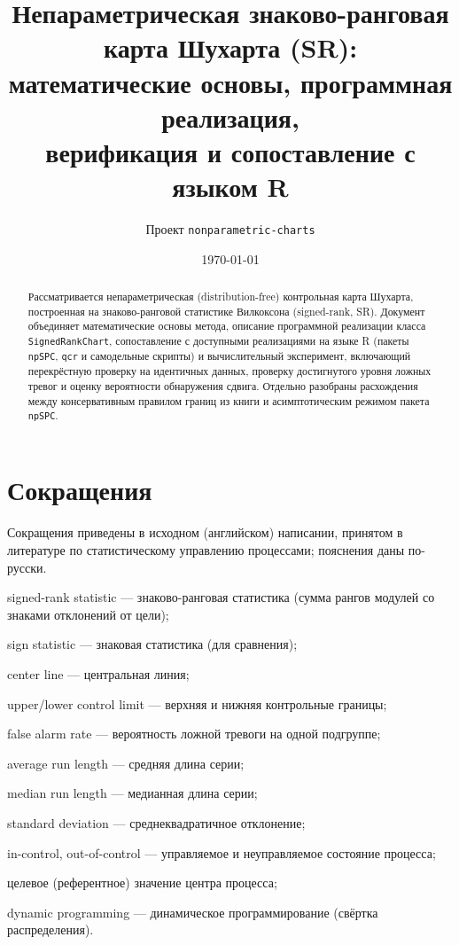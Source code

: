 \documentclass[11pt,a4paper]{article}
\title{\bfseries Непараметрическая знаково-ранговая карта Шухарта (SR):\\
математические основы, программная реализация,\\
верификация и сопоставление с языком R}
\author{Проект \texttt{nonparametric-charts}}
\date{\today}
\begin{document}
\maketitle

\begin{abstract}
\noindent
Рассматривается непараметрическая (distribution-free) контрольная карта
Шухарта, построенная на знаково-ранговой статистике Вилкоксона
(signed-rank, SR). Документ объединяет математические основы метода,
описание программной реализации класса \texttt{SignedRankChart},
сопоставление с доступными реализациями на языке R (пакеты \texttt{npSPC},
\texttt{qcr} и самодельные скрипты) и вычислительный эксперимент,
включающий перекрёстную проверку на идентичных данных, проверку
достигнутого уровня ложных тревог и оценку вероятности обнаружения сдвига.
Отдельно разобраны расхождения между консервативным правилом границ из книги
и асимптотическим режимом пакета \texttt{npSPC}.
\end{abstract}

\section*{Сокращения}
Сокращения приведены в исходном (английском) написании, принятом в
литературе по статистическому управлению процессами; пояснения даны
по-русски.

\begin{description}[leftmargin=2.8cm,itemsep=1pt]
  \item[SR] signed-rank statistic --- знаково-ранговая статистика (сумма
        рангов модулей со знаками отклонений от цели);
  \item[SN] sign statistic --- знаковая статистика (для сравнения);
  \item[CL] center line --- центральная линия;
  \item[UCL, LCL] upper/lower control limit --- верхняя и нижняя контрольные
        границы;
  \item[FAR] false alarm rate --- вероятность ложной тревоги на одной
        подгруппе;
  \item[ARL] average run length --- средняя длина серии;
  \item[MRL] median run length --- медианная длина серии;
  \item[SD] standard deviation --- среднеквадратичное отклонение;
  \item[IC, OOC] in-control, out-of-control --- управляемое и неуправляемое
        состояние процесса;
  \item[$\mu_0$] целевое (референтное) значение центра процесса;
  \item[DP] dynamic programming --- динамическое программирование
        (свёртка распределения).
\end{description}
\end{document}
